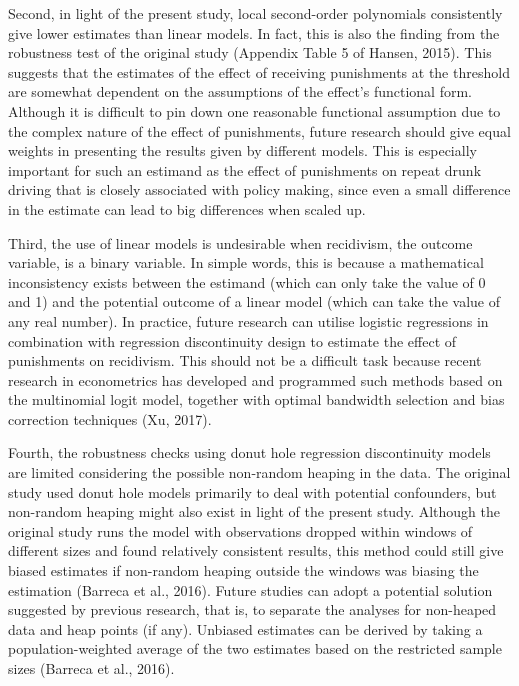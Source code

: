 \documentclass[
  11pt,
]{article}
\begin{document}
Second, in light of the present study, local second-order polynomials
consistently give lower estimates than linear models. In fact, this is
also the finding from the robustness test of the original study
(Appendix Table 5 of Hansen, 2015). This suggests that the estimates of
the effect of receiving punishments at the threshold are somewhat
dependent on the assumptions of the effect's functional form. Although
it is difficult to pin down one reasonable functional assumption due to
the complex nature of the effect of punishments, future research should
give equal weights in presenting the results given by different models.
This is especially important for such an estimand as the effect of
punishments on repeat drunk driving that is closely associated with
policy making, since even a small difference in the estimate can lead to
big differences when scaled up.

Third, the use of linear models is undesirable when recidivism, the
outcome variable, is a binary variable. In simple words, this is because
a mathematical inconsistency exists between the estimand (which can only
take the value of 0 and 1) and the potential outcome of a linear model
(which can take the value of any real number). In practice, future
research can utilise logistic regressions in combination with regression
discontinuity design to estimate the effect of punishments on
recidivism. This should not be a difficult task because recent research
in econometrics has developed and programmed such methods based on the
multinomial logit model, together with optimal bandwidth selection and
bias correction techniques (Xu, 2017).

Fourth, the robustness checks using donut hole regression discontinuity
models are limited considering the possible non-random heaping in the
data. The original study used donut hole models primarily to deal with
potential confounders, but non-random heaping might also exist in light
of the present study. Although the original study runs the model with
observations dropped within windows of different sizes and found
relatively consistent results, this method could still give biased
estimates if non-random heaping outside the windows was biasing the
estimation (Barreca et al., 2016). Future studies can adopt a potential
solution suggested by previous research, that is, to separate the
analyses for non-heaped data and heap points (if any). Unbiased
estimates can be derived by taking a population-weighted average of the
two estimates based on the restricted sample sizes (Barreca et al.,
2016).
\end{document}
